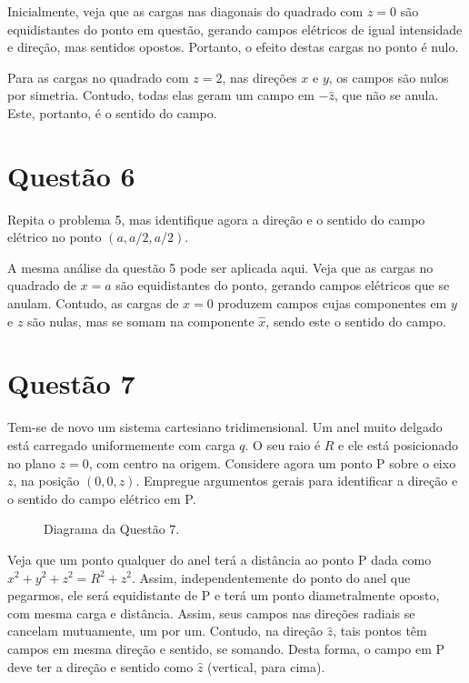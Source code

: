\documentclass[11pt]{article}
\begin{document}
Inicialmente, veja que as cargas nas diagonais do quadrado com \(z=0\) são
equidistantes do ponto em questão, gerando campos elétricos de igual
intensidade e direção, mas sentidos opostos. Portanto, o efeito destas
cargas no ponto é nulo.

Para as cargas no quadrado com \(z=2\), nas direções \(x\) e \(y\), os campos
são nulos por simetria. Contudo, todas elas geram um campo em \(-\hat
z\), que não se anula. Este, portanto, é o sentido do campo.  
\section{Questão 6}
\label{sec:orgd90b9c0}
Repita o problema 5, mas identifique agora a direção e o sentido do
campo elétrico no ponto \((a,a/2,a/2)\).

A mesma análise da questão 5 pode ser aplicada aqui. Veja que as cargas
no quadrado de \(x=a\) são equidistantes do ponto, gerando campos
elétricos que se anulam. Contudo, as cargas de \(x=0\) produzem campos
cujas componentes em \(y\) e \(z\) são nulas, mas se somam na componente
\(\hat x\), sendo este o sentido do campo. 
\section{Questão 7}
\label{sec:org9adc137}
Tem-se de novo um sistema cartesiano tridimensional. Um anel muito
delgado está carregado uniformemente com carga \(q\). O seu raio é \(R\) e
ele está posicionado no plano \(z=0\), com centro na origem. Considere
agora um ponto P sobre o eixo \(z\), na posição \((0,0,z)\). Empregue
argumentos gerais para identificar a direção e o sentido do campo
elétrico em P.

\begin{figure}[h!]
  \centering
  \caption{Diagrama da Questão 7.}
  \label{fig:ex-7}
\end{figure}

Veja que um ponto qualquer do anel terá a distância ao ponto P dada como
\(x^2+y^2+z^2=R^2+z^2\). Assim, independentemente do ponto do anel que
pegarmos, ele será equidistante de P e terá um ponto diametralmente
oposto, com mesma carga e distância. Assim, seus campos nas direções
radiais se cancelam mutuamente, um por um. Contudo, na direção \(\hat z\),
tais pontos têm campos em mesma direção e sentido, se somando. Desta
forma, o campo em P deve ter a direção e sentido como \(\hat z\)
(vertical, para cima).
\end{document}
